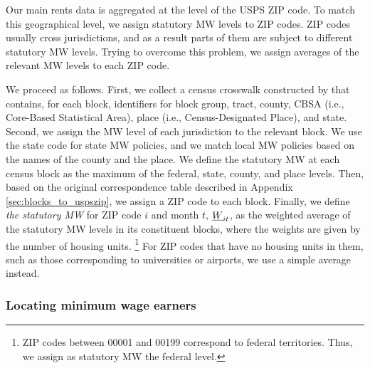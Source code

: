 Our main rents data is aggregated at the level of the USPS ZIP code.
To match this geographical level, we assign statutory MW levels to ZIP codes.
ZIP codes usually cross jurisdictions, and as a result parts of them are subject
to different statutory MW levels.
Trying to overcome this problem, we assign averages of the relevant MW levels to
each ZIP code.

We proceed as follows.
First, we collect a census crosswalk constructed by \textcite{CensusLODES} that 
contains, for each block, identifiers for block group, tract, county, CBSA 
(i.e., Core-Based Statistical Area), place (i.e., Census-Designated Place), and 
state.
Second, we assign the MW level of each jurisdiction to the relevant block.
We use the state code for state MW policies, and we match local MW policies 
based on the names of the county and the place.
We define the statutory MW at each census block as the maximum of the federal,
state, county, and place levels.
Then, based on the original correspondence table described in Appendix 
\ref{sec:blocks_to_uspszip}, we assign a ZIP code to each block.
Finally, we define \textit{the statutory MW} for ZIP code $i$ and month $t$, 
$\underline{W}_{it}$, as the weighted average of the statutory MW levels in its
constituent blocks, where the weights are given by the number of housing 
units.%
\footnote{ZIP codes between 00001 and 00199 correspond to federal territories.
Thus, we assign as statutory MW the federal level.}
For ZIP codes that have no housing units in them, such as those corresponding to 
universities or airports, we use a simple average instead.

\subsubsection*{Locating minimum wage earners}

